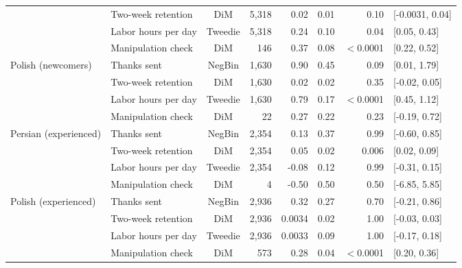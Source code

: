 \documentclass[9pt,twoside,lineno]{pnas-new}
\begin{document}
\begin{table}[ht]
\begin{tabular}{llcrrrrl}
 & Two-week retention & DiM & 5,318 & 0.02 & 0.01 & 0.10 & [-0.0031, 0.04] \\
 & Labor hours per day & Tweedie & 5,318 & 0.24 & 0.10 & 0.04 & [0.05, 0.43] \\
 & Manipulation check & DiM & 146 & 0.37 & 0.08 & $<$0.0001 & [0.22, 0.52] \\
\addlinespace
Polish (newcomers) & Thanks sent & NegBin & 1,630 & 0.90 & 0.45 & 0.09 & [0.01, 1.79] \\
 & Two-week retention & DiM & 1,630 & 0.02 & 0.02 & 0.35 & [-0.02, 0.05] \\
 & Labor hours per day & Tweedie & 1,630 & 0.79 & 0.17 & $<$0.0001 & [0.45, 1.12] \\
 & Manipulation check & DiM & 22 & 0.27 & 0.22 & 0.23 & [-0.19, 0.72] \\
\addlinespace
Persian (experienced) & Thanks sent & NegBin & 2,354 & 0.13 & 0.37 & 0.99 & [-0.60, 0.85] \\
 & Two-week retention & DiM & 2,354 & 0.05 & 0.02 & 0.006 & [0.02, 0.09] \\
 & Labor hours per day & Tweedie & 2,354 & -0.08 & 0.12 & 0.99 & [-0.31, 0.15] \\
 & Manipulation check & DiM & 4 & -0.50 & 0.50 & 0.50 & [-6.85, 5.85] \\
\addlinespace
Polish (experienced) & Thanks sent & NegBin & 2,936 & 0.32 & 0.27 & 0.70 & [-0.21, 0.86] \\
 & Two-week retention & DiM & 2,936 & 0.0034 & 0.02 & 1.00 & [-0.03, 0.03] \\
 & Labor hours per day & Tweedie & 2,936 & 0.0033 & 0.09 & 1.00 & [-0.17, 0.18] \\
 & Manipulation check & DiM & 573 & 0.28 & 0.04 & $<$0.0001 & [0.20, 0.36] \\
\bottomrule
\end{tabular}
\end{table}
\end{document}
